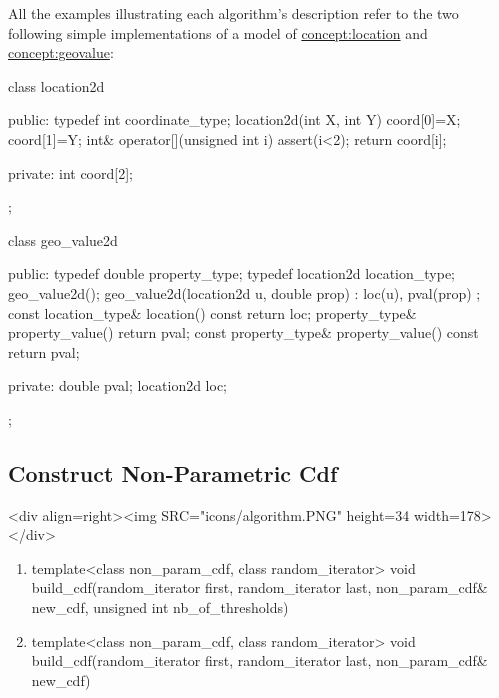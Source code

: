 \documentclass[12pt,twoside]{report}
\begin{document}
All the examples illustrating each algorithm's description refer to the two following simple implementations of a model of \hyperref{Location}{Location (see Section}{)}{concept:location} and \hyperref{Geo-Value}{Geo-Value (see Section}{)}{concept:geovalue}:


\begin{code}
class location2d{
  public:
    typedef int coordinate_type;
    location2d(int X, int Y) {coord[0]=X; coord[1]=Y;}
    int& operator[](unsigned int i) {
      assert(i<2); return coord[i];
    }
  
  private:
    int coord[2];
};
\end{code}

\begin{code}
class geo_value2d{
  public:
    typedef double property_type;
    typedef location2d location_type;
    geo_value2d();
    geo_value2d(location2d u, double prop) : loc(u), pval(prop) {};
    const location_type& location() const {return loc;}
    property_type& property_value() {return pval;}
    const property_type& property_value() const {return pval;}
  
  private:
    double pval;
    location2d loc;
};
\end{code}







\subsection{Construct Non-Parametric Cdf}
\begin{htmlonly}
<div align=right><img SRC="icons/algorithm.PNG" height=34 width=178></div>
\end{htmlonly}


\begin{enumerate}
\item 
\begin{code}
template<class non_param_cdf, class random_iterator>
void
build_cdf(random_iterator first, random_iterator last,
          non_param_cdf& new_cdf, unsigned int nb_of_thresholds) 
\end{code}

\item 
\begin{code}
template<class non_param_cdf, class random_iterator>
void
build_cdf(random_iterator first, random_iterator last,
          non_param_cdf& new_cdf) 
\end{code}

\end{enumerate}
\end{document}
